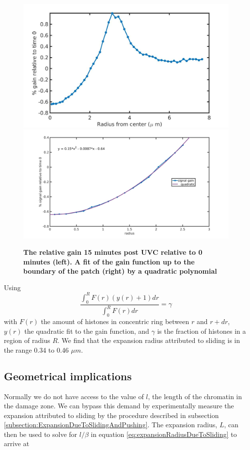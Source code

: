 \documentclass[12pt]{report}
\begin{document}
		
		\begin{figure}[H]
			\includegraphics[width=0.5\linewidth, height=0.3\textheight]{Images/PatchExpansion/relativeGainNucleosomesConcentric}
			\includegraphics[width=0.5\linewidth, height=0.3\textheight]{Images/PatchExpansion/nucleosomeSignalGainConcentricFit}
			\caption{\tiny{\textbf{The relative gain 15 minutes post UVC relative to 0 minutes (left). A fit of the gain function up to the boundary of the patch (right) by a quadratic polynomial}}}
			\label{fig:relativeGainNucleosomesConcentric}
		\end{figure}
		
		Using 		
		\begin{equation}\label{eq:HistonePreservationConcentric}
		\frac{\int_0^RF(r)(y(r)+1)dr}{\int_0^RF(r)dr} =\gamma
		\end{equation} 
		with $F(r)$ the amount of histones in concentric ring between $r$ and $r+dr$, $y(r)$ the quadratic fit to the gain function, and $\gamma$ is the fraction of histones in a region of radius $R$. We find that the expansion radius attributed to sliding is in the range 0.34 to 0.46 $\mu m$.  
		
		\subsection{Geometrical implications}\label{subsection:GeometricalImplications}
		Normally we do not have access to the value of $l$, the length of the chromatin in the damage zone. 
		We can bypass this demand by experimentally measure the expansion attributed to 
		sliding by the procedure described in subsection \ref{subsection:ExpansionDueToSlidingAndPushing}. The expansion radius, $L$, can then be used to solve for $l/\beta$ in equation \ref{eq:expansionRadiusDueToSliding} to arrive at
				
\end{document}

